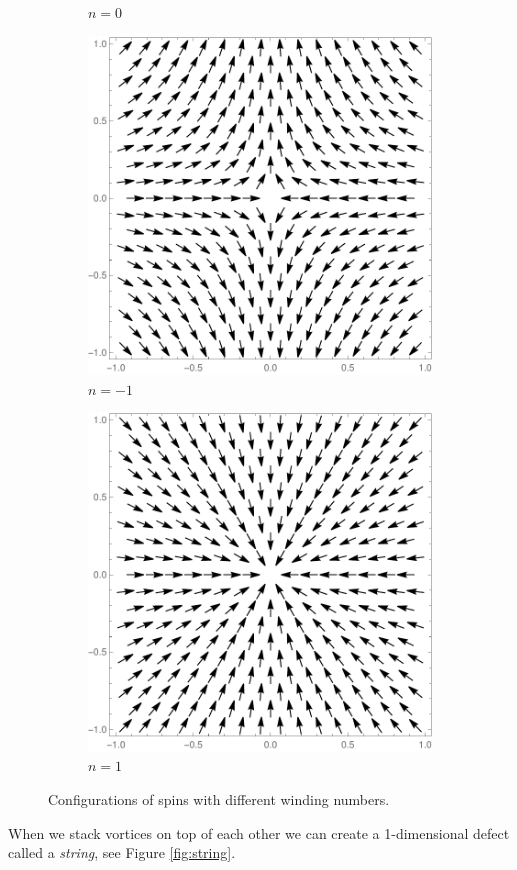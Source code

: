 \begin{figure}
\begin{subfigure}{0.45\textwidth}
		\caption{$n=0$}
	\end{subfigure}
	\begin{subfigure}{0.45\textwidth}
		\includegraphics[scale=1,trim= 120 100 100 100,clip]{./figures/n=-1.pdf}
		\caption{$n=-1$}
	\end{subfigure}
	\begin{subfigure}{0.45\textwidth}
		\includegraphics[scale=1,trim= 120 100 100 100,clip]{./figures/n=-1s.pdf}
		\caption{$n=1$}
	\end{subfigure}
	\caption{Configurations of spins with different winding numbers.}
	\label{fig:vortices}
\end{figure}
When we stack vortices on top of each other we can create a 1-dimensional defect called a \textit{string}, see Figure \ref{fig:string}.

